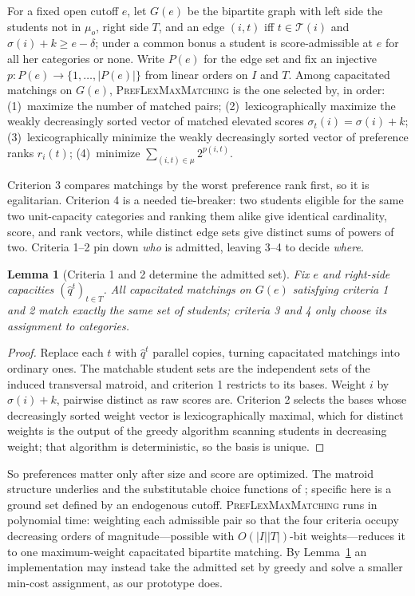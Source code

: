 \documentclass[a4paper,twoside]{article}
\newtheorem{lemma}{Lemma}
\theoremstyle{definition}
\renewcommand{\T}{\mathcal{T}}
\begin{document}
For a fixed open cutoff $e$, let $G(e)$ be the bipartite graph with left side the students not in $\mu_o$, right side $T$, and an edge $(i,t)$ iff $t\in\T(i)$ and $\sigma(i)+k\ge e-\delta$; under a common bonus a student is score-admissible at $e$ for all her categories or none. Write $P(e)$ for the edge set and fix an injective $p:P(e)\to\{1,\dots,|P(e)|\}$ from linear orders on $I$ and $T$. Among capacitated matchings on $G(e)$, \textsc{PrefLexMaxMatching} is the one selected by, in order: (1)~maximize the number of matched pairs; (2)~lexicographically maximize the weakly decreasingly sorted vector of matched elevated scores $\sigma_t(i)=\sigma(i)+k$; (3)~lexicographically minimize the weakly decreasingly sorted vector of preference ranks $r_i(t)$; (4)~minimize $\sum_{(i,t)\in\mu}2^{p(i,t)}$.

Criterion 3 compares matchings by the worst preference rank first, so it is egalitarian. Criterion 4 is a needed tie-breaker: two students eligible for the same two unit-capacity categories and ranking them alike give identical cardinality, score, and rank vectors, while distinct edge sets give distinct sums of powers of two. Criteria 1--2 pin down \emph{who} is admitted, leaving 3--4 to decide \emph{where}.

\begin{lemma}[Criteria 1 and 2 determine the admitted set]
\label{lem:matroid}
Fix $e$ and right-side capacities $(\hat q^t)_{t\in T}$. All capacitated matchings on $G(e)$ satisfying criteria 1 and 2 match exactly the same set of students; criteria 3 and 4 only choose its assignment to categories.
\end{lemma}

\begin{proof}
Replace each $t$ with $\hat q^t$ parallel copies, turning capacitated matchings into ordinary ones. The matchable student sets are the independent sets of the induced transversal matroid, and criterion 1 restricts to its bases. Weight $i$ by $\sigma(i)+k$, pairwise distinct as raw scores are. Criterion 2 selects the bases whose decreasingly sorted weight vector is lexicographically maximal, which for distinct weights is the output of the greedy algorithm scanning students in decreasing weight; that algorithm is deterministic, so the basis is unique.
\end{proof}

So preferences matter only after size and score are optimized. The matroid structure underlies \cite{Flei03a} and the substitutable choice functions of \cite{GKK+17a,KoSo16a}; specific here is a ground set defined by an endogenous cutoff. \textsc{PrefLexMaxMatching} runs in polynomial time: weighting each admissible pair so that the four criteria occupy decreasing orders of magnitude---possible with $O(|I||T|)$-bit weights---reduces it to one maximum-weight capacitated bipartite matching. By Lemma~\ref{lem:matroid} an implementation may instead take the admitted set by greedy and solve a smaller min-cost assignment, as our prototype does.
\end{document}
